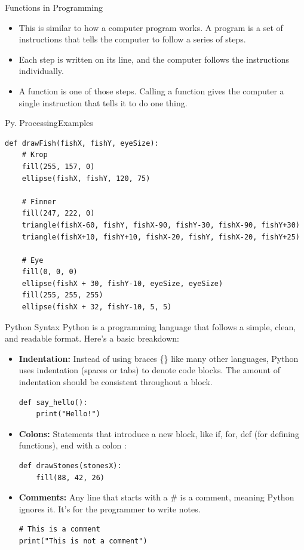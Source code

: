 \documentclass[10pt]{beamer}
\begin{document}
\begin{frame}[fragile]{Functions in Programming} %
\begin{itemize}
\item This is similar to how a computer program works. A program is a set of instructions that tells the computer to follow a series of steps. 
\item Each step is written on its line, and the computer follows the instructions individually.
\item A function is one of those steps. Calling a function gives the computer a single instruction that tells it to do one thing.
\end{itemize}
\end{frame}

\begin{frame}[fragile]{Py. Processing}{Examples}
\begin{lstlisting}
def drawFish(fishX, fishY, eyeSize):
    # Krop
    fill(255, 157, 0)
    ellipse(fishX, fishY, 120, 75)
    
    # Finner
    fill(247, 222, 0)
    triangle(fishX-60, fishY, fishX-90, fishY-30, fishX-90, fishY+30)
    triangle(fishX+10, fishY+10, fishX-20, fishY, fishX-20, fishY+25)

    # Eye
    fill(0, 0, 0)
    ellipse(fishX + 30, fishY-10, eyeSize, eyeSize)
    fill(255, 255, 255)
    ellipse(fishX + 32, fishY-10, 5, 5)

\end{lstlisting}	
\end{frame}


\begin{frame}[fragile]{Python Syntax}
Python is a programming language that follows a simple, clean, and readable format. Here's a basic breakdown:
\begin{itemize}
\item \textbf{Indentation:} Instead of using braces \{\} like many other languages, Python uses indentation (spaces or tabs) to denote code blocks. The amount of indentation should be consistent throughout a block.
\begin{lstlisting}
def say_hello():
    print("Hello!")
\end{lstlisting}
\item \textbf{Colons:} Statements that introduce a new block, like if, for, def (for defining functions), end with a colon :
\begin{lstlisting}
def drawStones(stonesX):
    fill(88, 42, 26)
\end{lstlisting}
\item \textbf{Comments:} Any line that starts with a \# is a comment, meaning Python ignores it. It's for the programmer to write notes.
\begin{lstlisting}
# This is a comment
print("This is not a comment")
\end{lstlisting}
\end{itemize}
\end{frame}
\end{document}
